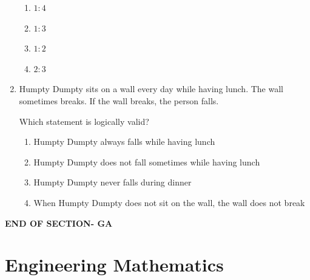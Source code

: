 \documentclass[journal,12pt,onecolumn]{IEEEtran}
\begin{document}
\begin{enumerate}[label=\arabic*)]
\vspace{0.2cm}
\begin{enumerate}[label=\alph*)]
\item $1:4$
\item $1:3$
\item $1:2$
\item $2:3$
\end{enumerate}

\vspace{0.5cm}

\item Humpty Dumpty sits on a wall every day while having lunch. The wall sometimes breaks. If the wall breaks, the person falls.

Which statement is logically valid?  

\vspace{0.2cm}
\begin{enumerate}[label=\alph*)]
\item Humpty Dumpty always falls while having lunch
\item Humpty Dumpty does not fall sometimes while having lunch
\item Humpty Dumpty never falls during dinner
\item When Humpty Dumpty does not sit on the wall, the wall does not break
\end{enumerate}

\end{enumerate}
\vspace{3\baselineskip}
\begin{center}
    \item[\textbf{END OF SECTION- GA}]
\end{center}


\newpage
\section*{Engineering Mathematics}
\vspace{1cm}
\end{document}
